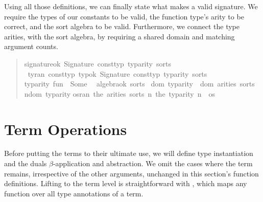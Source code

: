 
Using all those definitions, we can finally state what makes a valid signature.
We require the types of our constants to be valid, the function type's arity to be correct, and the sort algebra to be valid.
Furthermore, we connect the type arities, with the sort algebra, by requiring a shared domain and matching argument counts.

\begin{quote}
\begin{isabelle}%
 signature{\isacharunderscore}ok\ {\isacharparenleft}Signature\ const{\isacharunderscore}typ\ typ{\isacharunderscore}arity\ sorts{\isacharparenright}\ {\isacharequal}\isanewline
\ {\isacharparenleft}{\isasymforall}ty{\isasymin}ran\ const{\isacharunderscore}typ{\isachardot}\ {\isacharparenleft}typ{\isacharunderscore}ok{\isacharprime}\ {\isacharparenleft}Signature\ const{\isacharunderscore}typ\ typ{\isacharunderscore}arity\ sorts{\isacharparenright}{\isacharparenright}\ {\isasymand}\isanewline
\isaindent{\ }typ{\isacharunderscore}arity\ {\isacharprime}{\isacharprime}fun{\isacharprime}{\isacharprime}\ {\isacharequal}\ Some\ {}\ {\isasymand}\isanewline
\isaindent{\ }algebra{\isacharunderscore}ok\ sorts\ {\isasymand}\isanewline
\isaindent{\ }dom\ typ{\isacharunderscore}arity\ {\isacharequal}\ dom\ {\isacharparenleft}arities\ sorts{\isacharparenright}\ {\isasymand}\isanewline
\isaindent{\ }{\isacharparenleft}{\isasymforall}n{\isasymin}dom\ typ{\isacharunderscore}arity{\isachardot}\isanewline
\isaindent{\ {\isacharparenleft}\ \ \ }{\isasymforall}os{\isasymin}ran\ {\isacharparenleft}the\ {\isacharparenleft}arities\ sorts\ n{\isacharparenright}{\isacharparenright}{\isachardot}\ the\ {\isacharparenleft}typ{\isacharunderscore}arity\ n{\isacharparenright}\ {\isacharequal}\ {\isacharbar}os{\isacharbar}{\isacharparenright}{\isacharparenright}%
\end{isabelle}
\end{quote}

\section{Term Operations}

Before putting the terms to their ultimate use, we will define type instantiation and the duals \(\beta\)-application and abstraction.
We omit the cases where the term remains, irrespective of the other arguments, unchanged in this section's function definitions.
Lifting  to the term level is straightforward with , which maps any function over all type annotations of a term.

